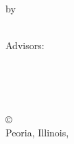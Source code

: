 \pagestyle{empty}

\begin{titlepage}
        \begin{center}
        \vspace*{1.0cm}

        \Huge
        {\bf \thesistitlecoverpage }

        \vspace*{1.0cm}

        \normalsize
        by \\

        \vspace*{1.0cm}

        \Large
        \thesisauthor\\
        Advisors:~\advisor\\

        \vspace*{3.0cm}


        \vspace*{2.0cm}

        \nameofprogram\\
        \academicunit\\
        \nameOfUniversity\\

        \vspace*{4.0cm}

        \copyright~\thesisauthor\remove{,}\\Peoria, Illinois, \graduationyear\\
        \end{center}
\end{titlepage}


\pagestyle{plain}
\setcounter{page}{2}

\cleardoublepage %



